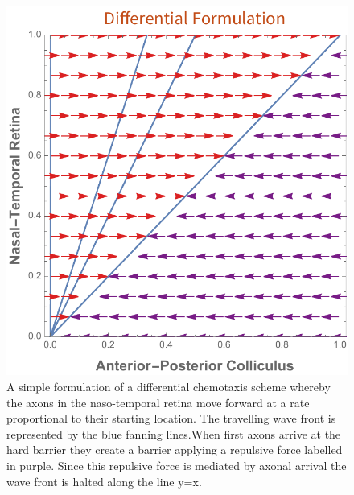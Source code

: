 \begin{figure}[h!]
	\centering
	\includegraphics[width=\textwidth]{images/introduction/differential_chemotaxis_type1}
	\def\c{A simple formulation of a differential chemotaxis scheme whereby the axons in the naso-temporal retina move forward at a rate proportional to their starting location. The travelling wave front is represented by the blue fanning lines.}
	\caption[\c]{\c When first axons arrive at the hard barrier they create a barrier applying a repulsive force labelled in purple. Since this repulsive force is mediated by axonal arrival the wave front is halted along the line y=x. \label{fig:diffchemotaxistype1}} 
\end{figure}
